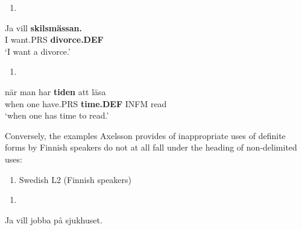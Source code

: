 \begin{enumerate} %
\item 
\end{enumerate} %
\ea\label{}
\gll Ja  vill  \textbf{skilsmässan.}\\


I  want.PRS  \textbf{divorce.DEF}\\ %


 ‘I want a divorce.’
\z


\begin{enumerate} %
\item 
\end{enumerate} %
\ea\label{}
\gll när  man  har  \textbf{tiden} att  läsa  \\


when  one  have.PRS  \textbf{time.DEF} INFM  read  \\ %


‘when one has time to read.’
\z


Conversely, the examples Axelsson provides of inappropriate uses of definite forms by Finnish speakers do not at all fall under the heading of non-delimited uses:


\begin{enumerate} %
\item 
\label{bkm:Ref115686476}Swedish L2 (Finnish speakers)

\end{enumerate} %
\setcounter{listLFOxcviiileveli}{0}
\begin{enumerate} %
\item 
\end{enumerate} %
\ea\label{}
\gll Ja  vill  jobba  på  sjukhuset.\\


